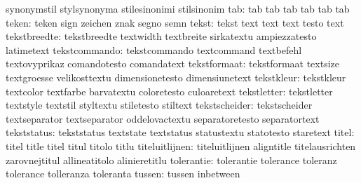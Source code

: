                            synonymstil               stylsynonyma
                           stilesinonimi             stilsinonim
                      tab: tab                       tab
                           tab                       tab
                           tab                       tab
                    teken: teken                     sign
                           zeichen                   znak
                           segno                     semn
                    tekst: tekst                     text
                           text                      text
                           testo                     text
             tekstbreedte: tekstbreedte              textwidth
                           textbreite                sirkatextu
                           ampiezzatesto             latimetext
            tekstcommando: tekstcommando             textcommand
                           textbefehl                textovyprikaz
                           comandotesto              comandatext
             tekstformaat: tekstformaat              textsize
                           textgroesse               velikosttextu
                           dimensionetesto           dimensiunetext
               tekstkleur: tekstkleur                textcolor
                           textfarbe                 barvatextu
                           coloretesto               culoaretext
              tekstletter: tekstletter               textstyle
                           textstil                  styltextu
                           stiletesto                stiltext
            tekstscheider: tekstscheider             textseparator
                           textseparator             oddelovactextu
                           separatoretesto           separatortext
              tekststatus: tekststatus               textstate
                           textstatus                statustextu
                           statotesto                staretext
                    titel: titel                     title
                           titel                     titul
                           titolo                    titlu
           titeluitlijnen: titeluitlijnen            aligntitle
                           titelausrichten           zarovnejtitul
                           allineatitolo             alinieretitlu
               tolerantie: tolerantie                tolerance
                           toleranz                  tolerance
                           tolleranza                toleranta
                   tussen: tussen                    inbetween
